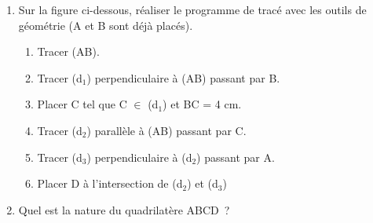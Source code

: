 \documentclass[exercice]{thedocument}%
\begin{document}
%
\begin{enumerate}
    \item Sur la figure ci-dessous, réaliser le programme de tracé avec les outils de
    géométrie (A et B sont déjà placés).
    \begin{enumerate}
        \item Tracer (AB).
        \item Tracer (d$_1$) perpendiculaire à (AB) passant par B.
        \item Placer C tel que C $\in$ (d$_1$) et BC = 4 cm.
        \item Tracer (d$_2$) parallèle à (AB) passant par C.
        \item Tracer (d$_3$) perpendiculaire à (d$_2$) passant par A.
        \item Placer D à l'intersection de (d$_2$) et (d$_3$)
    \end{enumerate}
    \item Quel est la nature du quadrilatère ABCD~?
\end{enumerate}
\begin{center}\noindent
\end{center}
\end{document}
